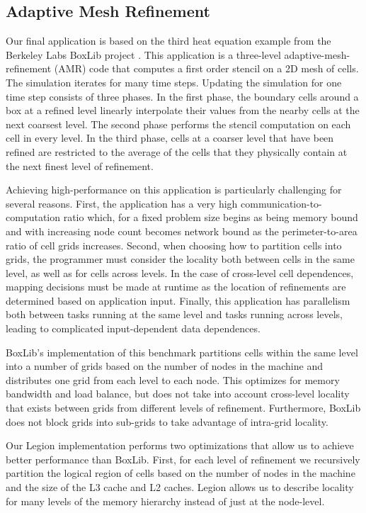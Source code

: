 \subsection{Adaptive Mesh Refinement}
\label{subsec:exp_amr}
Our final application is based on the third heat equation example from the Berkeley Labs 
BoxLib project \cite{BoxLib}.  This application is a three-level adaptive-mesh-refinement (AMR)
code that computes a first order stencil on a 2D mesh of cells.  The simulation iterates for many time
steps.  Updating the simulation for one time step consists of three phases.  In the first phase,
the boundary cells around a box at a refined level linearly interpolate their values from the nearby cells at the
next coarsest level.  The second phase performs the stencil computation on each cell in every level.
In the third phase, cells at a coarser level that have been refined are restricted to the average
of the cells that they physically contain at the next finest level of refinement.

Achieving high-performance on this application is particularly challenging for several reasons.  
First, the application has a very high communication-to-computation ratio which, for a fixed problem
size begins as being memory bound and with increasing node count becomes network bound as the
perimeter-to-area ratio of cell grids increases.  Second, when choosing how to partition cells into grids, the
programmer must consider the locality both between cells in the same level, as well as for cells
across levels.  In the case of cross-level cell dependences, mapping decisions must be made at runtime as the
location of refinements are determined based on application input.  Finally, this application has
parallelism both between tasks running at the same level and tasks running across levels, leading
to complicated input-dependent data dependences.

BoxLib's implementation of this benchmark partitions cells within the same level into a number of grids
based on the number of nodes in the machine and distributes one grid from each level to each node.  This
optimizes for memory bandwidth and load balance, but does not take into account cross-level locality 
that exists between grids from different levels of refinement.  Furthermore, BoxLib does not block grids
into sub-grids to take advantage of intra-grid locality.

Our Legion implementation performs two optimizations that allow us to achieve better performance than BoxLib.
First, for each level of refinement we recursively partition the logical region of cells based on 
the number of nodes in the machine and the size of the L3 cache and L2 caches.  Legion allows us to describe 
locality for many levels of the memory hierarchy instead of just at the node-level.

